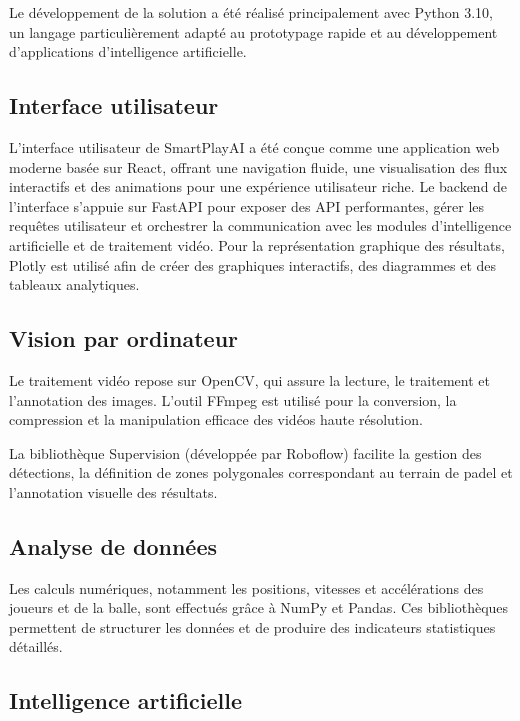 \begin{itemize}
Le développement de la solution a été réalisé principalement avec Python 3.10, un langage particulièrement adapté au prototypage rapide et au développement d’applications d’intelligence artificielle.

\subsection{Interface utilisateur}

L'interface utilisateur de SmartPlayAI a été conçue comme une application web moderne basée sur React, offrant une navigation fluide, une visualisation des flux interactifs et des animations pour une expérience utilisateur riche.
Le backend de l'interface s'appuie sur FastAPI pour exposer des API performantes, gérer les requêtes utilisateur et orchestrer la communication avec les modules d'intelligence artificielle et de traitement vidéo.
Pour la représentation graphique des résultats, Plotly est utilisé afin de créer des graphiques interactifs, des diagrammes et des tableaux analytiques.

\subsection{Vision par ordinateur}

Le traitement vidéo repose sur OpenCV, qui assure la lecture, le traitement et l’annotation des images. L’outil FFmpeg est utilisé pour la conversion, la compression et la manipulation efficace des vidéos haute résolution.

La bibliothèque Supervision (développée par Roboflow) facilite la gestion des détections, la définition de zones polygonales correspondant au terrain de padel et l’annotation visuelle des résultats.

\subsection{Analyse de données}

Les calculs numériques, notamment les positions, vitesses et accélérations des joueurs et de la balle, sont effectués grâce à NumPy et Pandas. Ces bibliothèques permettent de structurer les données et de produire des indicateurs statistiques détaillés.

\subsection{Intelligence artificielle}


\end{itemize}
